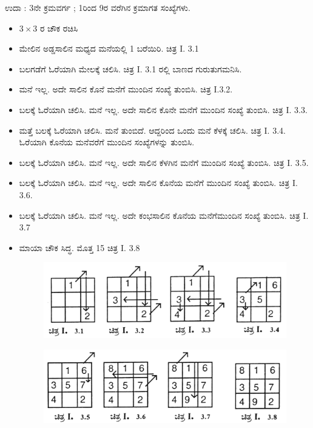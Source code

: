 ಉದಾ : 3ನೇ ಕ್ರಮವರ್ಗ ; 1ರಿಂದ 9ರ ವರೆಗಿನ ಕ್ರಮಾಗತ ಸಂಖ್ಯೆಗಳು.
\begin{itemize}
	\item $3 \times 3$ ರ ಚೌಕ ರಚಿಸಿ
	\item ಮೇಲಿನ ಅಡ್ಡಸಾಲಿನ ಮಧ್ಯದ ಮನೆಯಲ್ಲಿ 1 ಬರೆಯಿರಿ. ಚಿತ್ರ I. 3.1
	\item ಬಲಗಡೆಗೆ ಓರೆಯಾಗಿ ಮೇಲಕ್ಕೆ ಚಲಿಸಿ. ಚಿತ್ರ I. 3.1 ರಲ್ಲಿ ಬಾಣದ ಗುರುತು\break ಗಮನಿಸಿ.
	\item ಮನೆ ಇಲ್ಲ. ಅದೇ ಸಾಲಿನ ಕೊನೆ ಮನೆಗೆ ಮುಂದಿನ ಸಂಖ್ಯೆ ತುಂಬಿಸಿ. ಚಿತ್ರ I.3.2.
	\item ಬಲಕ್ಕೆ ಓರೆಯಾಗಿ ಚಲಿಸಿ. ಮನೆ ಇಲ್ಲ. ಅದೇ ಸಾಲಿನ ಕೊನೇ ಮನೆಗೆ ಮುಂದಿನ ಸಂಖ್ಯೆ ತುಂಬಿಸಿ. ಚಿತ್ರ I. 3.3.
	\item ಮತ್ತೆ ಬಲಕ್ಕೆ ಓರೆಯಾಗಿ ಚಲಿಸಿ. ಮನೆ ತುಂಬಿದೆ. ಆದ್ದರಿಂದ ಒಂದು ಮನೆ ಕೆಳಕ್ಕೆ ಚಲಿಸಿ. ಚಿತ್ರ I. 3.4. ಓರೆಯಾಗಿ ಕೊನೆಯ ಮನೆವರೆಗೆ ಮುಂದಿನ ಸಂಖ್ಯೆಗಳನ್ನು ತುಂಬಿಸಿ.
	\item ಬಲಕ್ಕೆ ಓರೆಯಾಗಿ ಚಲಿಸಿ. ಮನೆ ಇಲ್ಲ. ಅದೇ ಸಾಲಿನ ಕೆಳಗಿನ ಮನೆಗೆ ಮುಂದಿನ ಸಂಖ್ಯೆ ತುಂಬಿಸಿ. ಚಿತ್ರ I. 3.5.
	\item ಬಲಕ್ಕೆ ಓರೆಯಾಗಿ ಚಲಿಸಿ. ಮನೆ ಇಲ್ಲ. ಅದೇ ಸಾಲಿನ ಕೊನೆಯ ಮನೆಗೆ ಮುಂದಿನ ಸಂಖ್ಯೆ ತುಂಬಿಸಿ. ಚಿತ್ರ I. 3.6.
	\item ಬಲಕ್ಕೆ ಓರೆಯಾಗಿ ಚಲಿಸಿ. ಮನೆ ಇಲ್ಲ. ಅದೇ ಕಂಭಸಾಲಿನ ಕೊನೆಯ ಮನೆಗೆ\break ಮುಂದಿನ ಸಂಖ್ಯೆ ತುಂಬಿಸಿ. ಚಿತ್ರ I. 3.7
	\item ಮಾಯಾ ಚೌಕ ಸಿದ್ಧ. ಮೊತ್ತ 15 ಚಿತ್ರ I. 3.8
	\begin{figure}[h]
	\includegraphics[scale=.9]{src/figures/chap3/fig3.6.jpg}
	\end{figure}

\newpage

	\begin{figure}[h]
	\includegraphics{src/figures/chap3/fig3.7.jpg}
	\end{figure}


\end{itemize}
